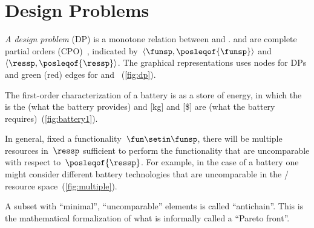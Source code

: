 \section{Design Problems}

\emph{A design problem} (DP) is a monotone relation between \emph{}
and \emph{}.  and 
are complete partial orders (CPO)~\cite{davey02}, indicated by~$\langle\funsp,\posleqof{\funsp}\rangle$
and~$\langle\ressp,\posleqof{\ressp}\rangle$.
The graphical representations
uses nodes for DPs and green (red) edges for  and
~(\cref{fig:dp}).

\begin{example}
    The first-order characterization of a battery is as a store of energy,
    in which the  is the  (what
    the battery provides) and  {[}kg{]} and  {[}\${]}
    are  (what the battery requires)~(\cref{fig:battery1}).
\end{example}

\noindent In general, fixed a functionality~$\fun\setin\funsp$, there
will be multiple resources in~$\ressp$ sufficient to perform the
functionality that are uncomparable with respect to~$\posleqof{\ressp}$.
For example, in the case of a battery one might consider different
battery technologies that are uncomparable in the /
resource space~(\cref{fig:multiple}).


A subset with ``minimal'', ``uncomparable'' elements is called
``antichain''.
This is the mathematical formalization of what is
informally called a ``Pareto front''.


